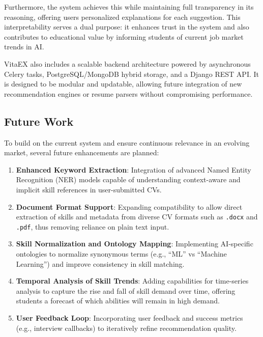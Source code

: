 \documentclass[runningheads]{llncs}
\begin{document}
Furthermore, the system achieves this while maintaining full transparency in its reasoning, offering users personalized explanations for each suggestion. This interpretability serves a dual purpose: it enhances trust in the system and also contributes to educational value by informing students of current job market trends in AI.

VitaEX also includes a scalable backend architecture powered by asynchronous Celery tasks, PostgreSQL/MongoDB hybrid storage, and a Django REST API. It is designed to be modular and updatable, allowing future integration of new recommendation engines or resume parsers without compromising performance.

\subsection*{Future Work}

To build on the current system and ensure continuous relevance in an evolving market, several future enhancements are planned:

\begin{enumerate}
	\item \textbf{Enhanced Keyword Extraction}: Integration of advanced Named Entity Recognition (NER) models capable of understanding context-aware and implicit skill references in user-submitted CVs.
	
	\item \textbf{Document Format Support}: Expanding compatibility to allow direct extraction of skills and metadata from diverse CV formats such as \texttt{.docx} and \texttt{.pdf}, thus removing reliance on plain text input.
	
	\item \textbf{Skill Normalization and Ontology Mapping}: Implementing AI-specific ontologies to normalize synonymous terms (e.g., “ML” vs “Machine Learning”) and improve consistency in skill matching.
	
	\item \textbf{Temporal Analysis of Skill Trends}: Adding capabilities for time-series analysis to capture the rise and fall of skill demand over time, offering students a forecast of which abilities will remain in high demand.
	
	\item \textbf{User Feedback Loop}: Incorporating user feedback and success metrics (e.g., interview callbacks) to iteratively refine recommendation quality.
\end{enumerate}
\end{document}
